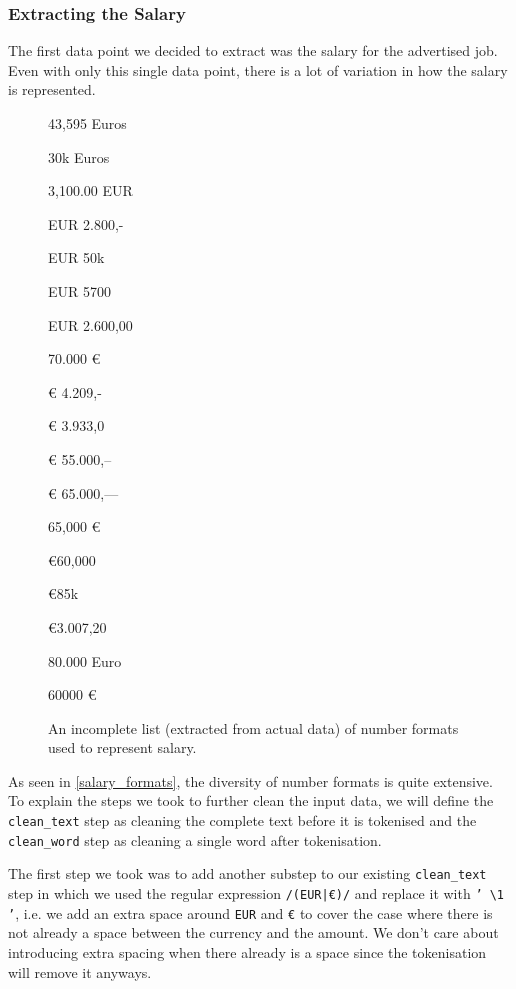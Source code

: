 \documentclass[runningheads]{llncs}
\begin{document}
\subsubsection{Extracting the Salary}
\label{subsub:extracting_the_salary}

The first data point we decided to extract was the salary for the advertised job. Even with only this single data point, there is a lot of variation in how the salary is represented.

\begin{figure}
\begin{multicols}{3}
\begin{description}
  \item 43,595 Euros
  \item 30k Euros
  \item 3,100.00 EUR
  \item EUR 2.800,-
  \item EUR 50k
  \item EUR 5700
  \item EUR 2.600,00
  \item 70.000 €
  \item € 4.209,-
  \item € 3.933,0
  \item € 55.000,--
  \item € 65.000,---
  \item 65,000 €
  \item €60,000
  \item €85k
  \item €3.007,20
  \item 80.000 Euro
  \item 60000 €
\end{description}
\end{multicols}
\caption{An incomplete list (extracted from actual data) of number formats used to represent salary.}
\label{salary_formats}
\end{figure}

As seen in \autoref{salary_formats}, the diversity of number formats is quite extensive. To explain the steps we took to further clean the input data, we will define the \texttt{clean\_text} step as cleaning the complete text before it is tokenised and the \texttt{clean\_word} step as cleaning a single word after tokenisation.

The first step we took was to add another substep to our existing \texttt{clean\_text} step in which we used the regular expression \texttt{/(EUR|€)/} and replace it with \texttt{' \textbackslash1 '}, i.e. we add an extra space around \texttt{EUR} and \texttt{€} to cover the case where there is not already a space between the currency and the amount. We don't care about introducing extra spacing when there already is a space since the tokenisation will remove it anyways.
\end{document}
